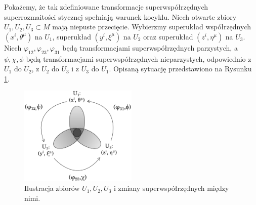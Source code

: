 \documentclass[11pt,a4paper]{report}
\theoremstyle{definition}
\begin{document}
Pokażemy, że tak zdefiniowane transformacje superwspółrzędnych superrozmaitości stycznej spełniają warunek kocyklu. Niech otwarte zbiory $U_1, U_2, U_3 \subset M$ mają niepuste przecięcie. Wybierzmy superukład współrzędnych $(x^i, \theta^\mu)$ na $U_1$, superukład $(y^i, \xi^\mu)$ na $U_2$ oraz superukład $(z^i, \eta^\mu)$ na $U_3$. Niech $\varphi_{12},\varphi_{23},\varphi_{31}$ będą transformacjami superwspółrzędnych parzystych, a $\psi, \chi, \phi$ będą transformacjami superwspółrzędnych nieparzystych, odpowiednio z $U_1$ do $U_2$, z $U_2$ do $U_3$ i z $U_3$ do $U_1$. Opisaną sytuację przedstawiono na Rysunku \ref{fig:supertangent_coord}.

\begin{figure}[htb]
\centering
\includegraphics[width=0.5\textwidth]{supertangent_coord.pdf}
\caption{Ilustracja zbiorów $U_1, U_2, U_3$ i zmiany superwspółrzędnych między nimi.}
\label{fig:supertangent_coord}
\end{figure}
\end{document}
